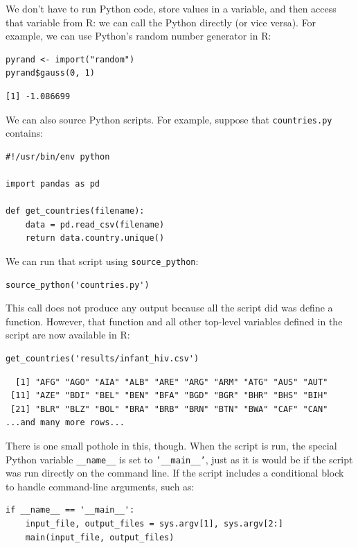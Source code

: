 We don't have to run Python code,
store values in a variable,
and then access that variable from R:
we can call the Python directly (or vice versa).
For example,
we can use Python's random number generator in R:

\begin{lstlisting}
pyrand <- import("random")
pyrand$gauss(0, 1)
\end{lstlisting}

\begin{lstlisting}
[1] -1.086699
\end{lstlisting}

We can also source Python scripts.
For example,
suppose that \texttt{countries.py} contains:

\begin{lstlisting}
#!/usr/bin/env python

import pandas as pd

def get_countries(filename):
    data = pd.read_csv(filename)
    return data.country.unique()
\end{lstlisting}

\noindent
We can run that script using \texttt{source\_python}:

\begin{lstlisting}
source_python('countries.py')
\end{lstlisting}

This call does not produce any output because all the script did was define a function.
However,
that function and all other top-level variables defined in the script are now available in R:

\begin{lstlisting}
get_countries('results/infant_hiv.csv')
\end{lstlisting}

\begin{lstlisting}
  [1] "AFG" "AGO" "AIA" "ALB" "ARE" "ARG" "ARM" "ATG" "AUS" "AUT"
 [11] "AZE" "BDI" "BEL" "BEN" "BFA" "BGD" "BGR" "BHR" "BHS" "BIH"
 [21] "BLR" "BLZ" "BOL" "BRA" "BRB" "BRN" "BTN" "BWA" "CAF" "CAN"
...and many more rows...
\end{lstlisting}

There is one small pothole in this, though.
When the script is run,
the special Python variable \texttt{\_\_name\_\_} is set to \texttt{'\_\_main\_\_'},
just as it is would be if the script was run directly on the command line.
If the script includes a conditional block to handle command-line arguments,
such as:

\begin{lstlisting}
if __name__ == '__main__':
    input_file, output_files = sys.argv[1], sys.argv[2:]
    main(input_file, output_files)
\end{lstlisting}

